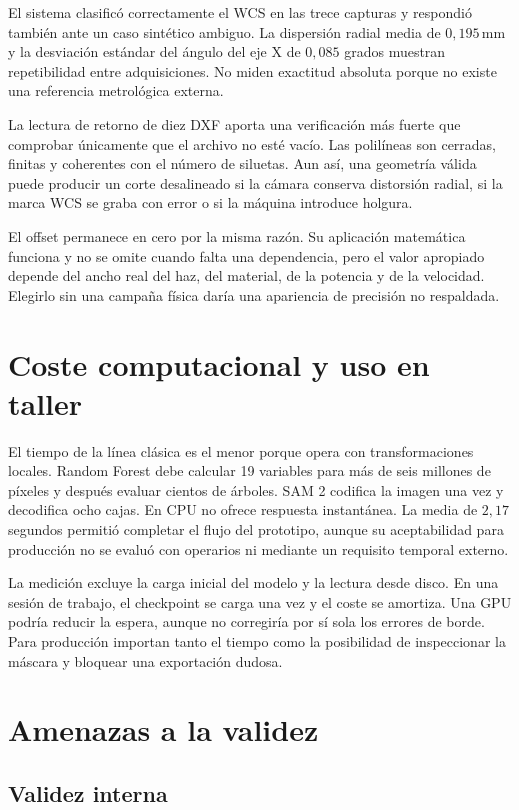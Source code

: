 El sistema clasificó correctamente el WCS en las trece capturas y respondió también ante un caso sintético ambiguo. La dispersión radial media de $0{,}195\,\text{mm}$ y la desviación estándar del ángulo del eje X de $0{,}085$ grados muestran repetibilidad entre adquisiciones. No miden exactitud absoluta porque no existe una referencia metrológica externa.

La lectura de retorno de diez DXF aporta una verificación más fuerte que comprobar únicamente que el archivo no esté vacío. Las polilíneas son cerradas, finitas y coherentes con el número de siluetas. Aun así, una geometría válida puede producir un corte desalineado si la cámara conserva distorsión radial, si la marca WCS se graba con error o si la máquina introduce holgura.

El offset permanece en cero por la misma razón. Su aplicación matemática funciona y no se omite cuando falta una dependencia, pero el valor apropiado depende del ancho real del haz, del material, de la potencia y de la velocidad. Elegirlo sin una campaña física daría una apariencia de precisión no respaldada.

\section{Coste computacional y uso en taller}

El tiempo de la línea clásica es el menor porque opera con transformaciones locales. Random Forest debe calcular 19 variables para más de seis millones de píxeles y después evaluar cientos de árboles. SAM 2 codifica la imagen una vez y decodifica ocho cajas. En CPU no ofrece respuesta instantánea. La media de $2{,}17$ segundos permitió completar el flujo del prototipo, aunque su aceptabilidad para producción no se evaluó con operarios ni mediante un requisito temporal externo.

La medición excluye la carga inicial del modelo y la lectura desde disco. En una sesión de trabajo, el checkpoint se carga una vez y el coste se amortiza. Una GPU podría reducir la espera, aunque no corregiría por sí sola los errores de borde. Para producción importan tanto el tiempo como la posibilidad de inspeccionar la máscara y bloquear una exportación dudosa.

\section{Amenazas a la validez}

\subsection{Validez interna}

